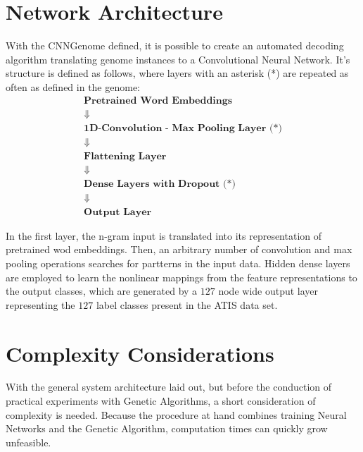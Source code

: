 \documentclass[11pt,a4paper,twoside,openright]{scrbook}
\begin{document}
\section{Network Architecture}
With the CNNGenome defined, it is possible to create an automated decoding algorithm translating genome instances to a Convolutional Neural Network. It's structure is defined as follows, where layers with an asterisk (*) are repeated as often as defined in the genome:
\begin{gather*}
   \boxed{\textbf{Pretrained Word Embeddings}} \\
   \Downarrow \\
   \boxed{\textbf{1D-Convolution - Max Pooling Layer (*)}} \\
   \Downarrow \\
   \boxed{\textbf{Flattening Layer}} \\
   \Downarrow \\
   \boxed{\textbf{Dense Layers with Dropout (*)}} \\
   \Downarrow \\
   \boxed{\textbf{Output Layer}}
\end{gather*}

In the first layer, the n-gram input is translated into its representation of pretrained wod embeddings. Then, an arbitrary number of convolution and max pooling operations searches for partterns in the input data.
Hidden dense layers are employed to learn the nonlinear mappings from the feature representations to the output classes, which are generated by a \(127\) node wide output layer representing the \(127\) label classes present in the ATIS data set.

\section{Complexity Considerations}
With the general system architecture laid out, but before the conduction of practical experiments with Genetic Algorithms, a short consideration of complexity is needed. Because the procedure at hand combines training Neural Networks and the Genetic Algorithm, computation times can quickly grow unfeasible.
\end{document}
